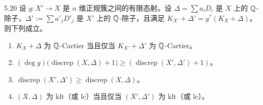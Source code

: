 \begin{propositionp}{5.20}
设 $g\colon X'\to X$ 是 $n$ 维正规簇之间的有限态射。设 $\Delta=\sum a_iD_i$ 是 $X$ 上的 $\mathbb{Q}$-除子，$\Delta':=\sum a'_jD'_j$ 是 $X'$ 上的 $\mathbb{Q}$-除子，且满足 $K_{X'}+\Delta'=g^*(K_X+\Delta)$。则下列成立。
\begin{enumerate}[label=(\arabic*),leftmargin=*]
\item $K_X+\Delta$ 为 $\mathbb{Q}$-Cartier 当且仅当 $K_{X'}+\Delta'$ 为 $\mathbb{Q}$-Cartier。
\item $(\deg g)\bigl(\operatorname{discrep}(X,\Delta)+1\bigr)\ge(\operatorname{discrep}(X',\Delta')+1)$。
\item $\operatorname{discrep}(X',\Delta')\ge\operatorname{discrep}(X,\Delta)$。
\item $(X,\Delta)$ 为 klt（或 lc）当且仅当 $(X',\Delta')$ 为 klt（或 lc）。
\end{enumerate}
\end{propositionp}
